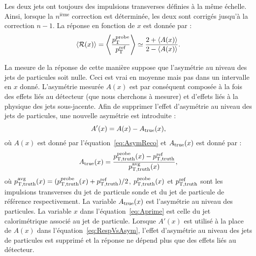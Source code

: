 
Les deux jets ont toujours des impulsions transverses d\'efinies \`a la m\^eme \'echelle. Ainsi, lorsque la $n^\text{i\`eme}$ correction est d\'etermin\'ee, les deux sont corrig\'es jusqu'\`a la correction $n-1$. La r\'eponse en fonction de $x$ est donn\'ee par :
\begin{equation}
 \langle \mathcal{R}(x) \rangle = \left \langle \frac{p_{\mathrm{T}}^{\rm probe}}{p_{\mathrm{T}}^{\rm ref}} \right \rangle \simeq \frac{2 + \langle A(x) \rangle }{2 - \langle A(x) \rangle}. 
\label{eq:RespVsAsym}
\end{equation}

La mesure de la r\'eponse de cette mani\`ere suppose que l'asym\'etrie au niveau des jets de particules soit nulle. Ceci est vrai en moyenne mais pas dans un intervalle en $x$ donn\'e. L'asym\'etrie mesur\'ee $A(x)$ est par cons\'equent compos\'ee \`a la fois des effets li\'es au d\'etecteur (que nous cherchons \`a mesurer) et d'effets li\'es \`a la physique des jets sous-jacente. Afin de supprimer l'effet d'asym\'etrie au niveau des jets de particules, une nouvelle asym\'etrie est introduite :
\begin{equation}
\label{eq:Aprime}
A'(x) = A(x) - A_{\rm true}(x),
\end{equation}
o\`u $A(x)$ est donn\'e par l'\'equation~\ref{eq:AsymReco} et $A_{\rm true}(x)$ est donn\'e par :
\begin{equation}
\label{eq:Atruegsc}
A_{\rm true}(x) = \frac{p_{{\rm T},{\rm truth}}^{\rm probe}(x)-p_{{\rm T},{\rm truth}}^{\rm ref}}{p_{{\rm T},{\rm truth}}^{\rm avg}(x)},
\end{equation}
o\`u $p_{{\rm T},{\rm truth}}^{\rm avg}(x) = (p_{{\rm T},{\rm truth}}^{\rm probe}(x)+p_{{\rm T},{\rm truth}}^{\rm ref})/2$, $p_{{\rm T},{\rm truth}}^{\rm probe}(x)$ et $p_{{\rm T},{\rm truth}}^{\rm ref}$ sont les impulsions transverses du jet de particule sonde et du jet de particule de r\'ef\'erence respectivement. La variable $A_{\rm true}(x)$ est l'asym\'etrie au niveau des particules. La variable $x$ dans l'\'equation~\ref{eq:Aprime} est celle du jet calorim\'etrique associ\'e au jet de particule. Lorsque $A'(x)$ est utilis\'e \`a la place de $A(x)$ dans l'\'equation~\ref{eq:RespVsAsym}, l'effet d'asym\'etrie au niveau des jets de particules est supprim\'e et la r\'eponse ne d\'epend plus que des effets li\'es au d\'etecteur.

